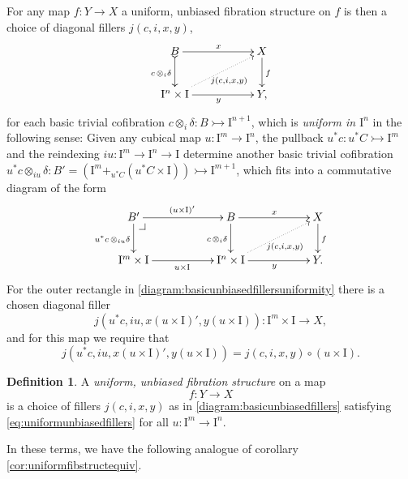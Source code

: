 \documentclass[11pt]{amsart}
\makeatletter
\newcommand{\mono}{\ensuremath{\rightarrowtail}}
\newcommand{\ra}{\ensuremath{\rightarrow}}
\newcommand{\I}{\ensuremath{\mathrm{I}}}
\theoremstyle{remark}
\theoremstyle{definition}
\newtheorem{definition}[theorem]{Definition}
\newcommand{\pbcorner}[1][dr]{\save*!/#1-1.2pc/#1:(-1,1)@^{|-}\restore}
\makeatother
\begin{document}
For any map $f:Y\ra X$  a uniform, unbiased fibration structure on $f$ is then a choice of diagonal fillers $j(c,i,x,y)$,
\begin{equation}\label{diagram:basicunbiasedfillers}
\xymatrix{
B \ar@{>->}[d]_{c\,\otimes_i\delta} \ar[rr]^x && X \ar[d]^f \\
\I^{n}\times \I \ar@{.>}[rru]_{j(c,i,x,y)} \ar[rr]_y && Y,
}
\end{equation}
for each basic trivial cofibration $c \otimes_i \delta : B \mono \I^{n+1}$, which is \emph{uniform in $\I^n$} in the following sense: Given any cubical map $u : \I^m \ra \I^n$, the pullback $u^*c : u^*C\mono \I^m$ and the reindexing $iu : \I^m \ra \I^n\ra\I$ determine another basic trivial cofibration $u^*c \otimes_{iu} \delta : B' = (\I^m +_{u^*C} (u^*C\times\I)) \mono \I^{m+1}$, which fits into a commutative diagram of the form
\begin{equation}\label{diagram:basicunbiasedfillersuniformity}
\xymatrix{
B' \ar[d]_{u^*c\,\otimes_{iu}\delta} \ar[rr]^{(u\times \I)'} \pbcorner  && B \ar[d]_{c\,\otimes_i\delta} \ar[rr]^x && X \ar[d]^f \\
\I^{m}\times \I  \ar[rr]_{u\times \I} && \I^{n}\times \I \ar@{.>}[rru]_{j(c,i,x,y)} \ar[rr]_y && Y.
}
\end{equation}
For the outer rectangle in \eqref{diagram:basicunbiasedfillersuniformity} there is a chosen diagonal filler 
$$j(u^*c,iu,x(u\times \I)', y(u\times \I)): \I^m\times\I\ra X,$$ and for this map we require that
\begin{equation}\label{eq:uniformunbiasedfillers}
j(u^*c,iu,x(u\times \I)', y(u\times \I)) = j(c,i,x,y)\circ (u\times \I).
\end{equation}

\begin{definition}\label{def:unbiasedfibstructure} A \emph{uniform, unbiased fibration structure} on a map $$f: Y\ra X$$ is a choice of fillers $j(c,i,x,y)$ as in \eqref{diagram:basicunbiasedfillers} satisfying \eqref{eq:uniformunbiasedfillers} for all $u : \I^m\ra\I^n$.
\end{definition}

In these terms, we have the following analogue of corollary \ref{cor:uniformfibstructequiv}.
\end{document}
